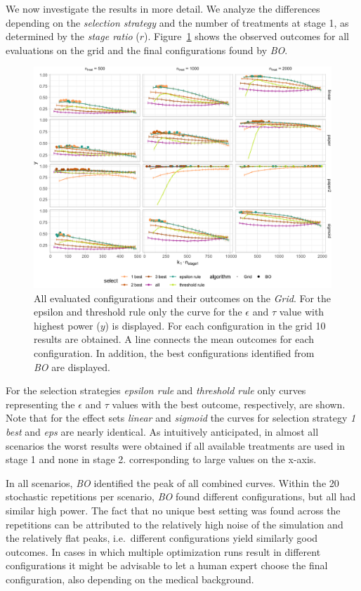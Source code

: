 \documentclass[bimj,fleqn]{w-art}
\theoremstyle{plain}
\theoremstyle{definition}
\begin{document}
We now investigate the results in more detail.
We analyze the differences depending on the \emph{selection strategy} and the number of treatments at stage 1, as determined by the \emph{stage ratio} ($r$).
Figure~\ref{fig:plot_allbest} shows the observed outcomes for all evaluations on the grid and the final configurations found by \emph{BO}.
\begin{figure}[htb]
\centering
\includegraphics[width=\linewidth]{generated/figures/plot_allbest.pdf}
\caption{%
  All evaluated configurations and their outcomes on the \emph{Grid}.
  For the epsilon and threshold rule only the curve for the $\epsilon$ and $\tau$ value with highest power ($y$) is displayed.
  For each configuration in the grid 10 %
  results are obtained.
  A line connects the mean outcomes for each configuration.
  In addition, the best configurations identified from \emph{BO} are displayed.
  }
\label{fig:plot_allbest}
\end{figure}
For the selection strategies \emph{epsilon rule} and \emph{threshold rule} only curves representing the $\epsilon$ and $\tau$ values with the best outcome, respectively, are shown.
Note that for the effect sets \emph{linear} and \emph{sigmoid} the curves for selection strategy \emph{1 best} and \emph{eps} are nearly identical.
As intuitively anticipated, in almost all scenarios the worst results were obtained if all available treatments are used in stage 1 and none in stage 2. corresponding to large values on the x-axis.

In all scenarios, \emph{BO} identified the peak of all combined curves.
Within the 20 stochastic repetitions per scenario, \emph{BO} found different configurations, but all had similar high power.
The fact that no unique best setting was found across the repetitions can be attributed to the relatively high noise of the simulation and the relatively flat peaks, i.e.\ different configurations yield similarly good outcomes.
In cases in which multiple optimization runs result in different configurations it might be advisable to let a human expert choose the final configuration, also depending on the medical background.
\end{document}
